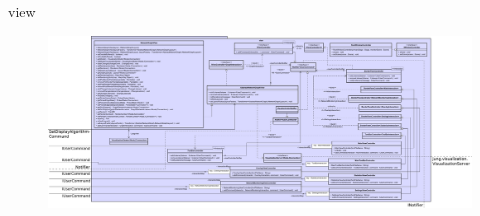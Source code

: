 \begin{frame}{view}
  \begin{figure}
    \centering
    \includegraphics[width=\textwidth]{./images/view.png}
  \end{figure}
\end{frame}
